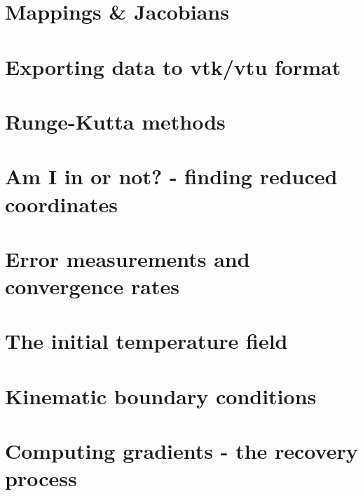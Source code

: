 \section{Mappings \& Jacobians \label{ss:mappings}}  %
\newpage %
\section{Exporting data to vtk/vtu format}  %
\newpage %
\section{Runge-Kutta methods}\label{ss:rkm}  %
\newpage %
\section{Am I in or not? - finding reduced coordinates}\label{sec:amiin} %
\newpage %
\section{Error measurements and convergence rates}  %
\newpage %
\section{The initial temperature field}  %
\newpage %
\section{Kinematic boundary conditions}\label{kin_bc}  %
\newpage %
\section{Computing gradients - the recovery process}  %
\newpage %
